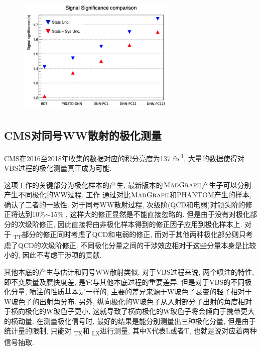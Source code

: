 \documentclass{SCIS2020cn}
\newcommand{\MADGRAPH}{\textsc{MadGraph}\xspace}
\newcommand{\Wboson}{\text{W}}
\begin{document}
\begin{figure}[ht!]
\centering
\includegraphics[width=3in,height=2.25in]{Figure-19.pdf}
\label{fig:19}
\end{figure}

\subsection{CMS对同号WW散射的极化测量}

CMS在2016至2018年收集的数据对应的积分亮度为137 fb\textsuperscript{-1}, 大量的数据使得对VBS过程的极化测量真正成为可能. 

这项工作的关键部分为极化样本的产生, 最新版本的$\MADGRAPH$产生子可以分别产生不同极化的WW过程. 工作 \cite{58} 通过对比$\MADGRAPH$和PHANTOM产生的样本, 确认了二者的一致性. 对于同号WW散射过程, 次级阶(QCD和电弱)对领头阶的修正将达到10\%$\sim$15\% , 这样大的修正显然是不能直接忽略的. 但是由于没有对极化部分的次级阶修正, 因此直接将由非极化样本得到的修正因子应用到极化样本上. 对于 \Wboson\textsubscript{T}\Wboson\textsubscript{T}部分的修正同时考虑了QCD和电弱的修正, 而对于其他两种极化部分则只考虑了QCD的次级阶修正. 不同极化分量之间的干涉效应相对于这些分量本身是比较小的, 因此不考虑干涉项的贡献. 

其他本底的产生与估计和同号WW散射类似. 对于VBS过程来说, 两个喷注的特性, 即不变质量及赝快度差, 是它与其他本底过程的重要差异. 但是对于VBS的不同极化分量, 喷注的性质基本是一样的, 主要的差异来源于W玻色子衰变的轻子相对于W玻色子的出射角分布. 另外, 纵向极化的W玻色子从入射部分子出射的角度相对于横向极化的W玻色子更小, 这就导致了横向极化的W玻色子将会倾向于携带更大的横动量. 在测量极化信号时, 最好的结果是能分别测量出三种极化分量, 但是由于统计量的限制, 只能对 \Wboson\textsubscript{T}\Wboson\textsubscript{X}和 \Wboson\textsubscript{L}\Wboson\textsubscript{X}进行测量, 其中X代表L或者T, 也就是说对应着两种信号抽取. 
\end{document}
